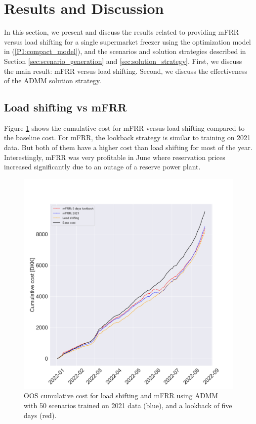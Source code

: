
\section{Results and Discussion}\label{sec:results}

In this section, we present and discuss the results related to providing mFRR versus load shifting for a single supermarket freezer using the optimization model in (\ref{P1:compact_model}), and the scenarios and solution strategies described in Section \ref{sec:scenario_generation} and \ref{sec:solution_strategy}. First, we discuss the main result: mFRR versus load shifting. Second, we discuss the effectiveness of the ADMM solution strategy.

\subsection{Load shifting vs mFRR}

Figure \ref{fig:cumulative_cost_comparison} shows the cumulative cost for mFRR versus load shifting compared to the baseline cost. For mFRR, the lookback strategy is similar to training on 2021 data. But both of them have a higher cost than load shifting for most of the year. Interestingly, mFRR was very profitable in June where reservation prices increased significantly due to an outage of a reserve power plant.

\begin{figure}[!t]
    \centering
    \includegraphics[width=\columnwidth]{../figures/cumulative_cost_comparison.png}
    \caption{OOS cumulative cost for load shifting and mFRR using ADMM with 50 scenarios trained on 2021 data (blue), and a lookback of five days (red).}
    \label{fig:cumulative_cost_comparison}
\end{figure}

